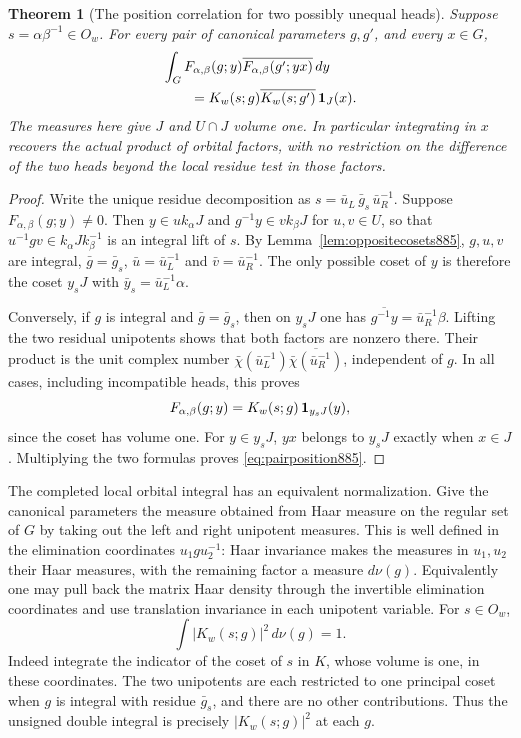 \documentclass[a4paper,11pt]{article}
\newtheorem{theorem}[proposition]{Theorem}
\theoremstyle{definition}
\theoremstyle{remark}
\numberwithin{equation}{section}
\begin{document}
\begin{theorem}[The position correlation for two possibly unequal heads]
\leavevmode\label{thm:mixedopen885}
Suppose \(s=\alpha\beta^{-1}\in O_w\). For every pair of canonical
parameters \(g,g'\), and every \(x\in G\),
\begin{align}
 &\int_G F_{\alpha,\beta}(g;y)
       \overline{F_{\alpha,\beta}(g';yx)}\,dy \notag\\
 &\hspace{2em}=
       K_w(s;g)\overline{K_w(s;g')}\,{\bf1}_J(x).
 \label{eq:pairposition885}
\end{align}
The measures here give \(J\) and \(U\cap J\) volume one.
In particular integrating in \(x\) recovers the actual product
of orbital factors, with no restriction on the difference of
the two heads beyond the local residue test in those factors.
\end{theorem}
\begin{proof}
Write the unique residue decomposition as
\(s=\bar u_L\,\bar g_s\,\bar u_R^{-1}\). Suppose
\(F_{\alpha,\beta}(g;y)\ne0\). Then \(y\in u k_\alpha J\) and
\(g^{-1}y\in v k_\beta J\) for \(u,v\in U\), so that
\(u^{-1}g v\in k_\alpha J k_\beta^{-1}\) is an integral lift of
\(s\). By Lemma~\ref{lem:oppositecosets885}, \(g,u,v\) are integral,
\(\bar g=\bar g_s\), \(\bar u=\bar u_L^{-1}\) and
\(\bar v=\bar u_R^{-1}\). The only possible coset of \(y\) is
therefore the coset \(y_sJ\) with
\(\bar y_s=\bar u_L^{-1}\alpha\).

Conversely, if \(g\) is integral and \(\bar g=\bar g_s\),
then on \(y_sJ\) one has
\(\overline{g^{-1}y}=\bar u_R^{-1}\beta\).
Lifting the two residual unipotents shows that both factors are
nonzero there. Their product is the unit complex number
\(\bar\chi(\bar u_L^{-1})\overline{\bar\chi(\bar u_R^{-1})}\),
independent of \(g\). In all cases, including incompatible heads,
this proves
\[
 F_{\alpha,\beta}(g;y)=K_w(s;g)\,{\bf1}_{y_sJ}(y),
\]
since the coset has volume one. For \(y\in y_sJ\), \(yx\) belongs
to \(y_sJ\) exactly when \(x\in J\). Multiplying the two
formulas proves \eqref{eq:pairposition885}.
\end{proof}

The completed local orbital integral has an equivalent normalization.
Give the canonical parameters the measure obtained from Haar measure
on the regular set of \(G\) by taking out the left and right
unipotent measures. This is well defined in the elimination
coordinates \(u_1 g u_2^{-1}\): Haar invariance makes the measures
in \(u_1,u_2\) their Haar measures, with the remaining factor a
measure \(d\nu(g)\). Equivalently one may pull back the matrix Haar
density through the invertible elimination coordinates and use
translation invariance in each unipotent variable. For \(s\in O_w\),
\begin{equation}
                   \int |K_w(s;g)|^2\,d\nu(g)=1.
 \label{eq:openisometry885}
\end{equation}
Indeed integrate the indicator of the coset of \(s\) in \(K\),
whose volume is one, in these coordinates. The two unipotents
are each restricted to one principal coset when \(g\) is integral
with residue \(\bar g_s\), and there are no other contributions.
Thus the unsigned double integral is precisely \(|K_w(s;g)|^2\)
at each \(g\).
\end{document}
